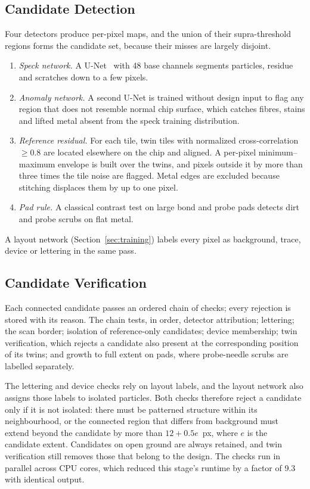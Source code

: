 \documentclass[journal]{IEEEtran}
\begin{document}
\subsection{Candidate Detection}
Four detectors produce per-pixel maps, and the union of their supra-threshold regions forms the candidate set, because their misses are largely disjoint.
\begin{enumerate}
\item \emph{Speck network.} A U-Net~\cite{ronneberger2015unet} with 48 base channels segments particles, residue and scratches down to a few pixels.
\item \emph{Anomaly network.} A second U-Net is trained without design input to flag any region that does not resemble normal chip surface, which catches fibres, stains and lifted metal absent from the speck training distribution.
\item \emph{Reference residual.} For each tile, twin tiles with normalized cross-correlation $\geq 0.8$ are located elsewhere on the chip and aligned. A per-pixel minimum--maximum envelope is built over the twins, and pixels outside it by more than three times the tile noise are flagged. Metal edges are excluded because stitching displaces them by up to one pixel.
\item \emph{Pad rule.} A classical contrast test on large bond and probe pads detects dirt and probe scrubs on flat metal.
\end{enumerate}
A layout network (Section~\ref{sec:training}) labels every pixel as background, trace, device or lettering in the same pass.

\subsection{Candidate Verification}\label{sec:verification}
Each connected candidate passes an ordered chain of checks; every rejection is stored with its reason. The chain tests, in order, detector attribution; lettering; the scan border; isolation of reference-only candidates; device membership; twin verification, which rejects a candidate also present at the corresponding position of its twins; and growth to full extent on pads, where probe-needle scrubs are labelled separately.

The lettering and device checks rely on layout labels, and the layout network also assigns those labels to isolated particles. Both checks therefore reject a candidate only if it is not isolated: there must be patterned structure within its neighbourhood, or the connected region that differs from background must extend beyond the candidate by more than $12 + 0.5e$~px, where $e$ is the candidate extent. Candidates on open ground are always retained, and twin verification still removes those that belong to the design. The checks run in parallel across CPU cores, which reduced this stage's runtime by a factor of 9.3 with identical output.
\end{document}
